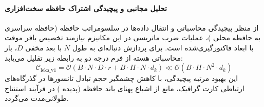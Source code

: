 \paragraph{تحلیل مجانبی و پیچیدگی اشتراک حافظه سخت‌افزاری}
از منظر پیچیدگی محاسباتی و انتقال داده‌ها در سلسومراتب حافظه (حافظه سراسری  به حافظه محلی )، عملیات ضرب ماتریسی در این مکانیزم نیازمند تخصیص بافر موقت با ابعاد فاکتورگیری‌شده است. برای پردازش دنباله‌ای به طول $N$ با بعد مخفی $D$، بار محاسباتی هسته از فرم درجه دو به رابطه زیر تقلیل می‌یابد:
\begin{equation}
\label{eq:complexity_leka_v1}
\mathcal{C}_{\text{leka\_v1}} = \mathcal{O}\left( B \cdot N \cdot D \cdot r + B \cdot H \cdot N \cdot d_k \right) \ll \mathcal{O}\left( B \cdot H \cdot N^2 \cdot d_k \right)
\end{equation}
این بهبود مرتبه پیچیدگی، با کاهش چشمگیر حجم تبادل تانسورها در گذرگاه‌های ارتباطی کارت گرافیک، مانع از اشباع پهنای باند حافظه (پدیده ) در فرآیند استنتاج طولانی‌مدت می‌گردد.